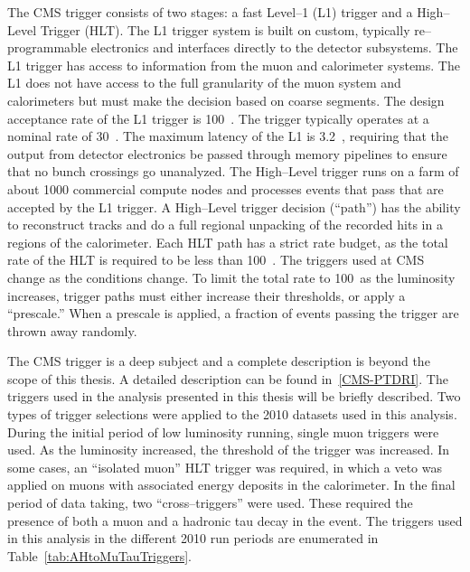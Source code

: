 The CMS trigger consists of two stages: a fast Level--1 (L1) trigger and a
High--Level Trigger (HLT).  The L1 trigger system is built on custom, typically
re--programmable electronics and interfaces directly to the detector subsystems.
The L1 trigger has access to information from the muon and calorimeter systems.
The L1 does not have access to the full granularity of the muon system and
calorimeters but must make the decision based on coarse segments.  The design
acceptance rate of the L1 trigger is 100~\kilo\hertz.  The trigger typically
operates at a nominal rate of 30~\kilo\hertz.  The maximum latency of the L1 is
3.2~\micro\second, requiring that the output from detector electronics be passed
through memory pipelines to ensure that no bunch crossings go unanalyzed.  The
High--Level trigger runs on a farm of about 1000 commercial compute nodes and
processes events that pass that are accepted by the L1 trigger.  A High--Level
trigger decision (``path'') has the ability to reconstruct tracks and do a full
regional unpacking of the recorded hits in a regions of the calorimeter.  Each
HLT path has a strict rate budget, as the total rate of the HLT is required to
be less than 100~\hertz.  The triggers used at CMS change as the conditions
change.  To limit the total rate to 100~\hertz as the luminosity increases,
trigger paths must either increase their thresholds, or apply a ``prescale.''
When a prescale is applied, a fraction of events passing the trigger are thrown
away randomly.

The CMS trigger is a deep subject and a complete description is beyond the scope
of this thesis.  A detailed description can be found in~\ref{CMS-PTDRI}. The
triggers used in the analysis presented in this thesis will be briefly
described.  Two types of trigger selections were applied to the 2010 datasets
used in this analysis.  During the initial period of low luminosity running,
single muon triggers were used.  As the luminosity increased, the \pt threshold
of the trigger was increased.  In some cases, an ``isolated muon'' HLT trigger
was required, in which a veto was applied on muons with associated energy
deposits in the calorimeter.  In the final period of data taking, two
``cross--triggers'' were used.  These required the presence of both a muon and a
hadronic tau decay in the event.  The triggers used in this analysis in the
different 2010 run periods are enumerated in Table~\ref{tab:AHtoMuTauTriggers}.

